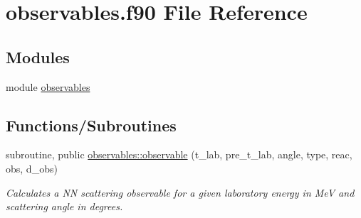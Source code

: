 \hypertarget{observables_8f90}{}\section{observables.\+f90 File Reference}
\label{observables_8f90}
\subsection*{Modules}
\begin{DoxyCompactItemize}
\item 
module \hyperlink{namespaceobservables}{observables}
\end{DoxyCompactItemize}
\subsection*{Functions/\+Subroutines}
\begin{DoxyCompactItemize}
\item 
subroutine, public \hyperlink{namespaceobservables_a82a92bf8aed4802ad0e9d4203e1e4314}{observables\+::observable} (t\+\_\+lab, pre\+\_\+t\+\_\+lab, angle, type, reac, obs, d\+\_\+obs)
\begin{DoxyCompactList}\small\item\em Calculates a NN scattering observable for a given laboratory energy in MeV and scattering angle in degrees. \end{DoxyCompactList}\end{DoxyCompactItemize}

